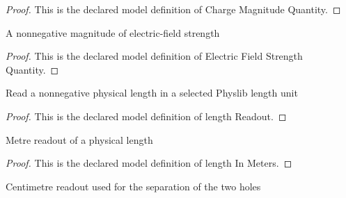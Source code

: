 \begin{proof}
  This is the declared model definition of Charge Magnitude Quantity.
\end{proof}
\begin{definition}
  \label{def:physics:phyx-mini-0838:phyxminiproblems-problemphyxmini0838-electricfieldstrengthquantity}
  A nonnegative magnitude of electric-field strength
\end{definition}
\begin{proof}
  This is the declared model definition of Electric Field Strength Quantity.
\end{proof}
\begin{definition}
  \label{def:physics:phyx-mini-0838:phyxminiproblems-problemphyxmini0838-lengthreadout}
  Read a nonnegative physical length in a selected Physlib length unit
\end{definition}
\begin{proof}
  This is the declared model definition of length Readout.
\end{proof}
\begin{definition}
  \label{def:physics:phyx-mini-0838:phyxminiproblems-problemphyxmini0838-lengthinmeters}
  Metre readout of a physical length
\end{definition}
\begin{proof}
  This is the declared model definition of length In Meters.
\end{proof}
\begin{definition}
  \label{def:physics:phyx-mini-0838:phyxminiproblems-problemphyxmini0838-lengthincentimeters}
  Centimetre readout used for the separation of the two holes
\end{definition}
